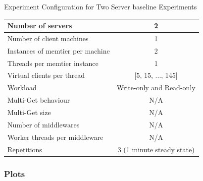 \documentclass[11pt,a4paper]{article}
\begin{document}
\begin{center}
	\scriptsize{
		Experiment Configuration for Two Server baseline Experiments
		\begin{tabular}{|l|c|}
			\hline Number of servers                & 2                        \\ 
			\hline Number of client machines        & 1                        \\ 
			\hline Instances of memtier per machine & 2                        \\ 
			\hline Threads per memtier instance     & 1                        \\
			\hline Virtual clients per thread       & [5, 15, ..., 145]        \\ 
			\hline Workload                         & Write-only and Read-only \\
			\hline Multi-Get behaviour               & N/A                      \\
			\hline Multi-Get size                   & N/A                      \\
			\hline Number of middlewares            & N/A                      \\
			\hline Worker threads per middleware    & N/A                      \\
			\hline Repetitions                      & 3 (1 minute steady state)\\ 
			\hline 
		\end{tabular}
	} 
\end{center}
\subsubsection{Plots}
	
\end{document}
